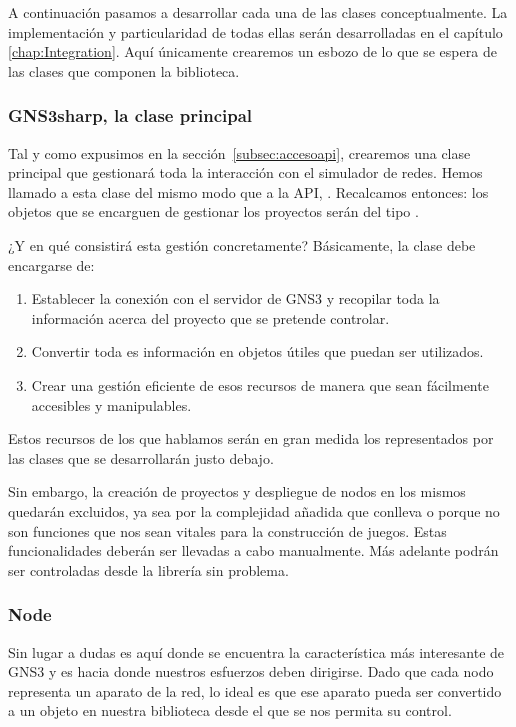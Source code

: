 A continuación pasamos a desarrollar cada una de las clases conceptualmente. La implementación y particularidad de todas ellas serán desarrolladas en el capítulo \ref{chap:Integration}. Aquí únicamente crearemos un esbozo de lo que se espera de las clases que componen la biblioteca.

\subsubsection[''La clase principal'']{GNS3sharp, la clase principal}
Tal y como expusimos en la sección~\ref{subsec:accesoapi}, crearemos una clase principal que gestionará toda la interacción con el simulador de redes. Hemos llamado a esta clase del mismo modo que a la API, \GNSCS. Recalcamos entonces: los objetos que se encarguen de gestionar los proyectos serán del tipo \GNSCS.

¿Y en qué consistirá esta gestión concretamente? Básicamente, la clase debe encargarse de:
\begin{enumerate}
\item Establecer la conexión con el servidor de GNS3 y recopilar toda la información acerca del proyecto que se pretende controlar.
\item Convertir toda es información en objetos útiles que puedan ser utilizados.
\item Crear una gestión eficiente de esos recursos de manera que sean fácilmente accesibles y manipulables.
\end{enumerate}

Estos recursos de los que hablamos serán en gran medida los representados por las clases que se desarrollarán justo debajo.

Sin embargo, la creación de proyectos y despliegue de nodos en los mismos quedarán excluidos, ya sea por la complejidad añadida que conlleva o porque no son funciones que nos sean vitales para la construcción de juegos. Estas funcionalidades deberán ser llevadas a cabo manualmente. Más adelante podrán ser controladas desde la librería sin problema.

\subsubsection{Node}
Sin lugar a dudas es aquí donde se encuentra la característica más interesante de GNS3 y es hacia donde nuestros esfuerzos deben dirigirse. Dado que cada nodo representa un aparato de la red, lo ideal es que ese aparato pueda ser convertido a un objeto en nuestra biblioteca desde el que se nos permita su control. 

